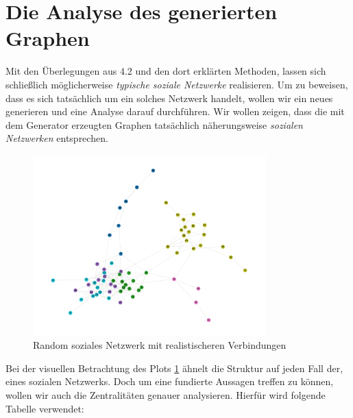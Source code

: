 \section{Die Analyse des generierten Graphen}
Mit den Überlegungen aus 4.2 und den dort erklärten Methoden, lassen sich schließlich möglicherweise \textit{typische soziale Netzwerke} realisieren. Um zu beweisen, dass es sich tatsächlich um ein solches Netzwerk handelt, wollen wir ein neues generieren und eine Analyse darauf durchführen. Wir wollen zeigen, dass die mit dem Generator erzeugten Graphen tatsächlich näherungsweise \textit{sozialen Netzwerken} entsprechen.

\FloatBarrier
\begin{figure}[h!]
    \centering
    \hspace*{-2cm}
    \includegraphics[width=0.8\textwidth]{Graphics/Random_moreConnections.png}
    \caption{Random soziales Netzwerk mit realistischeren Verbindungen}
    \label{fig:SNA}
\end{figure}

\FloatBarrier

Bei der visuellen Betrachtung des Plots \ref{fig:SNA} ähnelt die Struktur auf jeden Fall der, eines sozialen Netzwerks. Doch um eine fundierte Aussagen treffen zu können, wollen wir auch die Zentralitäten genauer analysieren. Hierfür wird folgende Tabelle verwendet:

